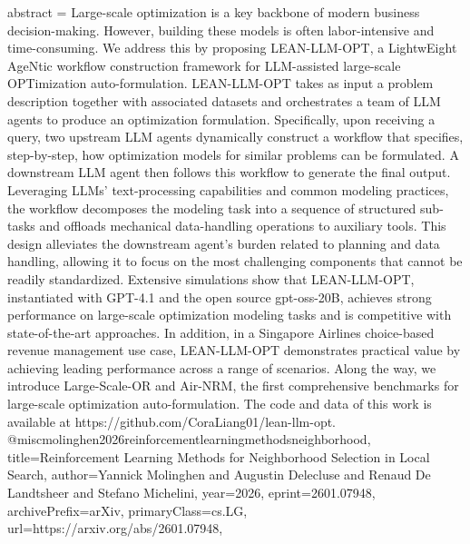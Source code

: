 {      abstract = {Large-scale optimization is a key backbone of modern business decision-making. However, building these models is often labor-intensive and time-consuming. We address this by proposing LEAN-LLM-OPT, a LightwEight AgeNtic workflow construction framework for LLM-assisted large-scale OPTimization auto-formulation. LEAN-LLM-OPT takes as input a problem description together with associated datasets and orchestrates a team of LLM agents to produce an optimization formulation. Specifically, upon receiving a query, two upstream LLM agents dynamically construct a workflow that specifies, step-by-step, how optimization models for similar problems can be formulated. A downstream LLM agent then follows this workflow to generate the final output. Leveraging LLMs' text-processing capabilities and common modeling practices, the workflow decomposes the modeling task into a sequence of structured sub-tasks and offloads mechanical data-handling operations to auxiliary tools. This design alleviates the downstream agent's burden related to planning and data handling, allowing it to focus on the most challenging components that cannot be readily standardized. Extensive simulations show that LEAN-LLM-OPT, instantiated with GPT-4.1 and the open source gpt-oss-20B, achieves strong performance on large-scale optimization modeling tasks and is competitive with state-of-the-art approaches. In addition, in a Singapore Airlines choice-based revenue management use case, LEAN-LLM-OPT demonstrates practical value by achieving leading performance across a range of scenarios. Along the way, we introduce Large-Scale-OR and Air-NRM, the first comprehensive benchmarks for large-scale optimization auto-formulation. The code and data of this work is available at https://github.com/CoraLiang01/lean-llm-opt.}
}@misc{molinghen2026reinforcementlearningmethodsneighborhood,
      title={Reinforcement Learning Methods for Neighborhood Selection in Local Search}, 
      author={Yannick Molinghen and Augustin Delecluse and Renaud De Landtsheer and Stefano Michelini},
      year={2026},
      eprint={2601.07948},
      archivePrefix={arXiv},
      primaryClass={cs.LG},
      url={https://arxiv.org/abs/2601.07948},
}
